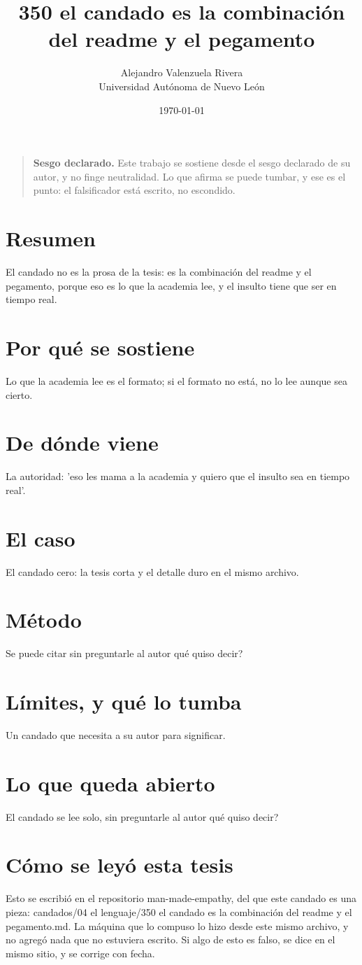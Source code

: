 \documentclass[11pt,a4paper]{article}
\title{350 el candado es la combinación del readme y el pegamento}
\author{Alejandro Valenzuela Rivera\\\small Universidad Autónoma de Nuevo León}
\date{\today}
\begin{document}
\maketitle

\begin{quote}
\textbf{Sesgo declarado.} Este trabajo se sostiene desde el sesgo declarado de su autor, y no finge neutralidad. Lo que afirma se puede tumbar, y ese es el punto: el falsificador está escrito, no escondido.
\end{quote}

\section*{Resumen}
El candado no es la prosa de la tesis: es la combinación del readme y el pegamento, porque eso es lo que la academia lee, y el insulto tiene que ser en tiempo real.

\section{Por qué se sostiene}
Lo que la academia lee es el formato; si el formato no está, no lo lee aunque sea cierto.

\section{De dónde viene}
La autoridad: 'eso les mama a la academia y quiero que el insulto sea en tiempo real'.

\section{El caso}
El candado cero: la tesis corta y el detalle duro en el mismo archivo.

\section{Método}
\textquestiondown{}Se puede citar sin preguntarle al autor qué quiso decir?

\section{Límites, y qué lo tumba}
Un candado que necesita a su autor para significar.

\section{Lo que queda abierto}
\textquestiondown{}El candado se lee solo, sin preguntarle al autor qué quiso decir?

\section*{Cómo se leyó esta tesis}
Esto se escribió en el repositorio man-made-empathy, del que este candado es una pieza: candados/04 el lenguaje/350 el candado es la combinación del readme y el pegamento.md. La máquina que lo compuso lo hizo desde este mismo archivo, y no agregó nada que no estuviera escrito. Si algo de esto es falso, se dice en el mismo sitio, y se corrige con fecha.
\end{document}
